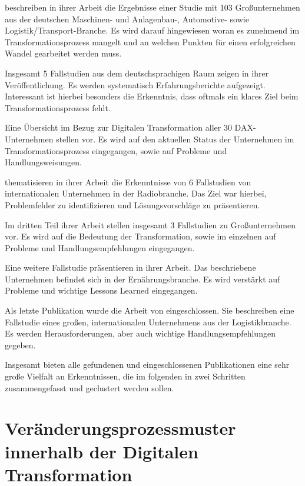  beschreiben in ihrer Arbeit die Ergebnisse einer Studie mit 103 Großunternehmen aus der deutschen Maschinen- und Anlagenbau-, Automotive- sowie Logistik/Transport-Branche. Es wird darauf hingewiesen woran es zunehmend im Transformationsprozess mangelt und an welchen Punkten für einen erfolgreichen Wandel gearbeitet werden muss.

Insgesamt 5 Fallstudien aus dem deutschsprachigen Raum zeigen  in ihrer Veröffentlichung. Es werden systematisch Erfahrungsberichte aufgezeigt. Interessant ist hierbei besonders die Erkenntnis, dass oftmals ein klares  Ziel beim Transformationsprozess fehlt.

Eine Übersicht im Bezug zur Digitalen Transformation aller 30 DAX-Unternehmen stellen  vor. Es wird auf den aktuellen Status der Unternehmen im Transformationsprozess eingegangen, sowie  auf  Probleme und Handlungsweisungen.

 thematisieren in ihrer  Arbeit die Erkenntnisse von 6 Fallstudien von internationalen Unternehmen in der Radiobranche. Das Ziel war hierbei, Problemfelder zu identifizieren und Lösungsvorschläge zu präsentieren.

Im dritten Teil ihrer Arbeit stellen  insgesamt 3  Fallstudien zu Großunternehmen vor. Es wird  auf die Bedeutung der Transformation, sowie im einzelnen auf Probleme und Handlungsempfehlungen eingegangen.

Eine weitere Fallstudie präsentieren  in ihrer Arbeit. Das beschriebene Unternehmen befindet sich in der Ernährungsbranche. Es wird verstärkt auf Probleme und wichtige Lessons Learned eingegangen.

Als letzte Publikation wurde die Arbeit von  eingeschlossen. Sie beschreiben eine Fallstudie eines großen, internationalen Unternehmens aus der Logistikbranche. Es werden Herausforderungen, aber auch wichtige Handlungsempfehlungen gegeben.

Insgesamt bieten alle gefundenen und eingeschlossenen Publikationen eine sehr große Vielfalt an Erkenntnissen, die im folgenden in zwei Schritten zusammengefasst und geclustert werden sollen.

\section{Veränderungsprozessmuster innerhalb der Digitalen Transformation}
\label{problemfields:changepatterns}

